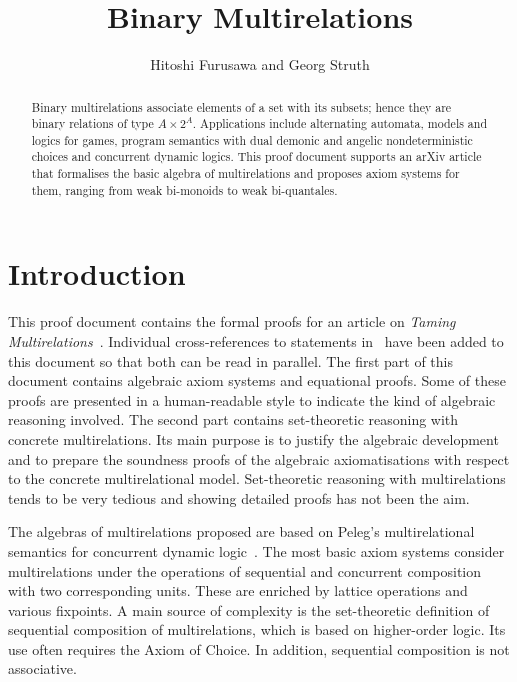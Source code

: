 \documentclass[11pt,a4paper]{article}
\begin{document}
\title{Binary Multirelations}
\author{Hitoshi Furusawa and Georg Struth}

\maketitle

\begin{abstract}
  Binary multirelations associate elements of a set with its subsets;
  hence they are binary relations of type $A\times 2^A$.  Applications
  include alternating automata, models and logics for games, program
  semantics with dual demonic and angelic nondeterministic choices and
  concurrent dynamic logics.  This proof document supports an arXiv
  article that formalises the basic algebra of multirelations and
  proposes axiom systems for them, ranging from weak bi-monoids to
  weak bi-quantales.
\end{abstract}

\tableofcontents

\section{Introduction}

This proof document contains the formal proofs for an article on
\emph{Taming Multirelations}~\cite{FurusawaS15a}.  Individual
cross-references to statements in~\cite{FurusawaS15a} have been added
to this document so that both can be read in parallel.  The first part
of this document contains algebraic axiom systems and equational
proofs.  Some of these proofs are presented in a human-readable style
to indicate the kind of algebraic reasoning involved.  The second part
contains set-theoretic reasoning with concrete multirelations.  Its
main purpose is to justify the algebraic development and to prepare
the soundness proofs of the algebraic axiomatisations with
respect to the concrete multirelational model. Set-theoretic
reasoning with multirelations tends to be very tedious and showing
detailed proofs has not been the aim.

The algebras of multirelations proposed are based on Peleg's
multirelational semantics for concurrent dynamic
logic~\cite{Peleg87}. The most basic axiom systems consider
multirelations under the operations of sequential and concurrent
composition with two corresponding units.  These are enriched by
lattice operations and various fixpoints.  A main source of complexity
is the set-theoretic definition of sequential composition of
multirelations, which is based on higher-order logic. Its use often
requires the Axiom of Choice. In addition, sequential composition is
not associative.
\end{document}
